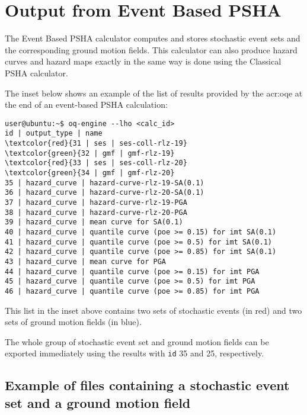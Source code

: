 \section{Output from Event Based PSHA}\label{EventBasedOutput}
%
The Event Based PSHA calculator computes and stores stochastic 
event sets and the corresponding ground motion fields. 
%
This calculator can also produce hazard curves and hazard maps
exactly in the same way is done using the Classical PSHA calculator.

The inset below shows an example of the list of results provided by 
the \gls{acr:oqe} at the end of an event-based PSHA calculation:
%
\begin{Verbatim}[frame=single, commandchars=\\\{\}, fontsize=\small]
user@ubuntu:~$ oq-engine --lho <calc_id> 
id | output_type | name
\textcolor{red}{31 | ses | ses-coll-rlz-19}
\textcolor{green}{32 | gmf | gmf-rlz-19}
\textcolor{red}{33 | ses | ses-coll-rlz-20}
\textcolor{green}{34 | gmf | gmf-rlz-20}
35 | hazard_curve | hazard-curve-rlz-19-SA(0.1)
36 | hazard_curve | hazard-curve-rlz-20-SA(0.1)
37 | hazard_curve | hazard-curve-rlz-19-PGA
38 | hazard_curve | hazard-curve-rlz-20-PGA
39 | hazard_curve | mean curve for SA(0.1)
40 | hazard_curve | quantile curve (poe >= 0.15) for imt SA(0.1)
41 | hazard_curve | quantile curve (poe >= 0.5) for imt SA(0.1)
42 | hazard_curve | quantile curve (poe >= 0.85) for imt SA(0.1)
43 | hazard_curve | mean curve for PGA
44 | hazard_curve | quantile curve (poe >= 0.15) for imt PGA
45 | hazard_curve | quantile curve (poe >= 0.5) for imt PGA
46 | hazard_curve | quantile curve (poe >= 0.85) for imt PGA
\end{Verbatim}
This list in the inset above contains two sets of stochastic events 
(in red) and two sets of ground motion fields (in blue).

The whole group of stochastic event set and ground motion fields can 
be exported immediately using the results with \texttt{id} 35 and 25,
respectively.

\subsection{Example of files containing a stochastic event set and a 
ground motion field}

